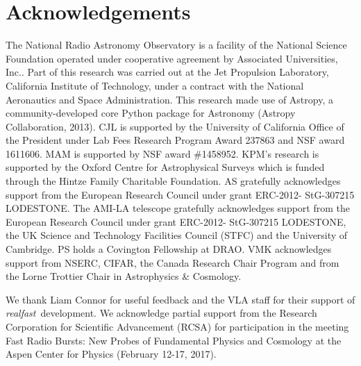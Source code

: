 \documentclass[twocolumn]{aastex61}
\newcommand{\rf}{\emph{realfast}}
\begin{document}
\section*{Acknowledgements}
The National Radio Astronomy Observatory is a facility of the National Science Foundation operated under cooperative agreement by Associated Universities, Inc..
Part of this research was carried out at the Jet Propulsion Laboratory, California Institute of Technology, under a contract with the National Aeronautics and Space Administration.
This research made use of Astropy, a community-developed core Python package for Astronomy (Astropy Collaboration, 2013).
CJL is supported by the University of California Office of the President under Lab Fees Research Program Award 237863 and NSF award 1611606. MAM is supported by NSF award \#1458952. KPM's research is supported by the Oxford Centre for Astrophysical Surveys which is funded through the Hintze Family Charitable Foundation. AS gratefully acknowledges support from the European Research Council under grant ERC-2012- StG-307215 LODESTONE. The AMI-LA telescope gratefully acknowledges support from the European Research Council under grant ERC-2012- StG-307215 LODESTONE, the UK Science and Technology Facilities Council (STFC) and the University of Cambridge. PS holds a Covington Fellowship at DRAO.
VMK acknowledges support from NSERC, CIFAR, the Canada Research Chair Program and from the Lorne Trottier Chair in Astrophysics \& Cosmology.

We thank Liam Connor for useful feedback and the VLA staff for their support of \rf\ development. We acknowledge partial support from the Research Corporation for Scientific Advancement (RCSA) for participation in the meeting Fast Radio Bursts: New Probes of Fundamental Physics and Cosmology at the Aspen Center for Physics (February 12-17, 2017).


\end{document}
